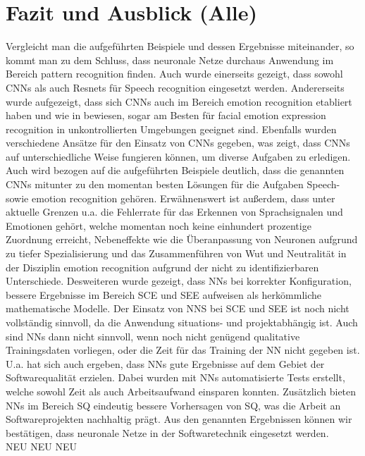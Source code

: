 \section{Fazit und Ausblick (Alle)}
Vergleicht man die aufgeführten Beispiele und dessen Ergebnisse miteinander, so kommt man zu dem Schluss, dass neuronale Netze durchaus Anwendung im Bereich pattern recognition finden. Auch wurde einerseits gezeigt, dass sowohl CNNs als auch Resnets für Speech recognition eingesetzt werden. Andererseits wurde aufgezeigt, dass sich CNNs auch im Bereich emotion recognition etabliert haben und wie in \cite{wildemotionrec} bewiesen, sogar am Besten für facial emotion expression recognition in unkontrollierten Umgebungen geeignet sind. Ebenfalls wurden verschiedene Ansätze für den Einsatz von CNNs gegeben, was zeigt, dass CNNs auf unterschiedliche Weise fungieren können, um diverse Aufgaben zu erledigen. Auch wird bezogen auf die aufgeführten Beispiele deutlich, dass die genannten CNNs mitunter zu den momentan besten Lösungen für die Aufgaben Speech- sowie emotion recognition gehören. Erwähnenswert ist außerdem, dass unter aktuelle Grenzen u.a. die Fehlerrate für das Erkennen von Sprachsignalen und Emotionen gehört, welche momentan noch keine einhundert prozentige Zuordnung erreicht, Nebeneffekte wie die Überanpassung von Neuronen aufgrund zu tiefer Spezialisierung und das Zusammenführen von Wut und Neutralität in der Disziplin emotion recognition aufgrund der nicht zu identifizierbaren Unterschiede. Desweiteren wurde gezeigt, dass NNs bei korrekter Konfiguration, bessere Ergebnisse im Bereich SCE und SEE aufweisen als herkömmliche mathematische Modelle. Der Einsatz von NNS bei SCE und SEE ist noch nicht vollständig sinnvoll, da die Anwendung situations- und projektabhängig ist. Auch sind NNs dann nicht sinnvoll, wenn noch nicht genügend qualitative Trainingsdaten vorliegen, oder die Zeit für das Training der NN nicht gegeben ist.
U.a. hat sich auch ergeben, dass NNs gute Ergebnisse auf dem Gebiet der Softwarequalität erzielen. Dabei wurden mit NNs automatisierte Tests erstellt, welche sowohl Zeit als auch Arbeitsaufwand einsparen konnten. Zusätzlich bieten NNs im Bereich SQ eindeutig bessere Vorhersagen von SQ, was die Arbeit an Softwareprojekten nachhaltig prägt. Aus den genannten Ergebnissen können wir bestätigen, dass neuronale Netze in der Softwaretechnik eingesetzt werden.\\

NEU NEU NEU\\

